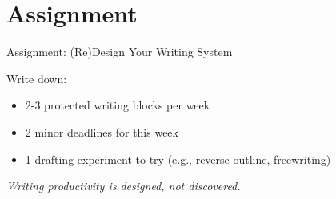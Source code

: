 \documentclass{beamer}
\begin{document}
\section{Assignment}

\begin{frame}{Assignment: (Re)Design Your Writing System}

Write down:
\begin{itemize}
    \item 2-3 protected writing blocks per week
    \item 2 minor deadlines for this week
    \item 1 drafting experiment to try {\small (e.g., reverse outline, freewriting)}
\end{itemize}

\vspace{1em}

\center
\textit{Writing productivity is designed, not discovered.}

\end{frame}

\end{document}
